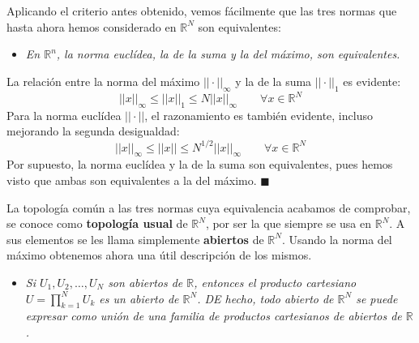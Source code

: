 \documentclass[a4paper, 12pt]{article}
\begin{document}
\begin{enumerate}[label=\textbf{\arabic*}.]
Aplicando el criterio antes obtenido, vemos fácilmente que las tres normas que hasta ahora hemos considerado en \(\mathbb{R}^N\) son equivalentes:

\begin{itemize}
	\item \textit{En \(\mathbb{R}^n\), la norma euclídea, la de la suma y la del máximo, son equivalentes.}
\end{itemize}

La relación entre la norma del máximo \(||\cdot||_{\infty}\) y la de la suma \(||\cdot||_1\) es evidente:
\[
	||x||_{\infty} \leq ||x||_1 \leq N ||x||_{\infty} \qquad \forall x \in \mathbb{R}^N
\]
Para la norma euclídea \(||\cdot||\), el razonamiento es también evidente, incluso mejorando la segunda desigualdad:
\[
	||x||_{\infty} \leq ||x|| \leq N^{1/2} ||x||_{\infty} \qquad \forall x \in \mathbb{R}^N
\]
Por supuesto, la norma euclídea y la de la suma son equivalentes, pues hemos visto que ambas son equivalentes a la del máximo. \hfill \(\blacksquare\)

La topología común a las tres normas cuya equivalencia acabamos de comprobar, se conoce como \textbf{topología usual} de \(\mathbb{R}^N\), por ser la que siempre se usa en \(\mathbb{R}^N\). A sus elementos se les llama simplemente \textbf{abiertos} de \(\mathbb{R}^N\). Usando la norma del máximo obtenemos ahora una útil descripción de los mismos.

\begin{itemize}
	\item \textit{Si \(U_1, U_2, \dotsc, U_N\) son abiertos de \(\mathbb{R}\), entonces el producto cartesiano \(U = \prod_{k=1}^{N} U_k\) es un abierto de \(\mathbb{R}^N\). DE hecho, todo abierto de \(\mathbb{R}^N\) se puede expresar como unión de una familia de productos cartesianos de abiertos de \(\mathbb{R}\).}
\end{itemize}
\end{enumerate}
\end{document}
